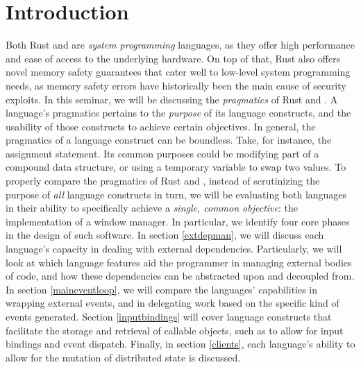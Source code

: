 \section{Introduction}\label{introduction}

Both Rust and \cpp are \textit{system programming} languages, as they offer
high performance and ease of access to the underlying hardware. On top of that,
Rust also offers novel memory safety guarantees that cater well to low-level
system programming needs, as memory safety errors have historically been
the main cause of security exploits. In this seminar, we will be discussing
the \textit{pragmatics} of Rust and \cpp. A language's pragmatics pertains
to the \textit{purpose} of its language constructs, and the usability of
those constructs to achieve certain objectives. In general, the pragmatics
of a language construct can be boundless. Take, for instance, the assignment
statement. Its common purposes could be modifying part of a compound data
structure, or using a temporary variable to swap two values. To properly
compare the pragmatics of Rust and \cpp, instead of scrutinizing the purpose
of \textit{all} language constructs in turn, we will be evaluating both
languages in their ability to specifically achieve a \textit{single, common
objective}: the implementation of a window manager. In particular, we identify
four core phases in the design of such software. In section \ref{extdepman}, we
will discuss each language's capacity in dealing with external dependencies.
Particularly, we will look at which language features aid the programmer in
managing external bodies of code, and how these dependencies can be abstracted
upon and decoupled from. In section \ref{maineventloop}, we will compare the
languages' capabilities in wrapping external events, and in delegating work
based on the specific kind of events generated. Section \ref{inputbindings} will
cover language constructs that facilitate the storage and retrieval of callable
objects, such as to allow for input bindings and event dispatch. Finally, in
section \ref{clients}, each language's ability to allow for the mutation of
distributed state is discussed.

